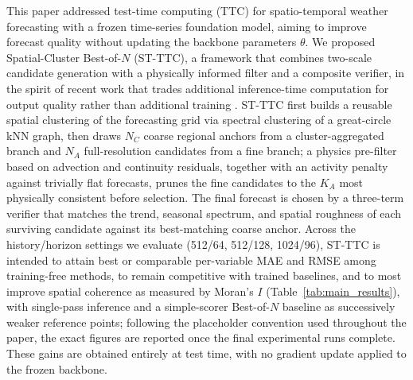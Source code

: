 \documentclass[preprint,12pt]{elsarticle}
\begin{document}
This paper addressed test-time computing (TTC) for spatio-temporal weather forecasting with a frozen time-series foundation model, aiming to improve forecast quality without updating the backbone parameters $\theta$. We proposed Spatial-Cluster Best-of-$N$ (ST-TTC), a framework that combines two-scale candidate generation with a physically informed filter and a composite verifier, in the spirit of recent work that trades additional inference-time computation for output quality rather than additional training \citep{snell2024scaling,ji2025survey}. ST-TTC first builds a reusable spatial clustering of the forecasting grid via spectral clustering of a great-circle kNN graph, then draws $N_C$ coarse regional anchors from a cluster-aggregated branch and $N_A$ full-resolution candidates from a fine branch; a physics pre-filter based on advection and continuity residuals, together with an activity penalty against trivially flat forecasts, prunes the fine candidates to the $K_A$ most physically consistent before selection. The final forecast is chosen by a three-term verifier that matches the trend, seasonal spectrum, and spatial roughness of each surviving candidate against its best-matching coarse anchor. Across the history/horizon settings we evaluate (512/64, 512/128, 1024/96), ST-TTC is intended to attain best or comparable per-variable MAE and RMSE among training-free methods, to remain competitive with trained baselines, and to most improve spatial coherence as measured by Moran's $I$ (Table~\ref{tab:main_results}), with single-pass inference and a simple-scorer Best-of-$N$ baseline \citep{snell2024scaling} as successively weaker reference points; following the placeholder convention used throughout the paper, the exact figures are reported once the final experimental runs complete. These gains are obtained entirely at test time, with no gradient update applied to the frozen backbone.
\end{document}
